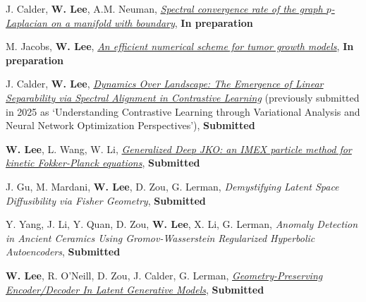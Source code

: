 

\begin{cvparagraph}

\vspace{0.5cm}
\begin{cvitems}
  \item J. Calder, \textbf{W. Lee}, A.M. Neuman, \href{}{\textit{Spectral convergence rate of the graph $p$-Laplacian on a manifold with boundary}}, \textbf{In preparation}
    \medskip
  \item M. Jacobs, \textbf{W. Lee}, \href{}{\textit{An efficient numerical scheme for tumor growth models}}, \textbf{In preparation}
    \medskip
  \item J. Calder, \textbf{W. Lee}, \href{https://arxiv.org/pdf/2503.10812}{\textit{Dynamics Over Landscape: The Emergence of Linear Separability via Spectral Alignment in Contrastive Learning}} (previously submitted in 2025 as `Understanding Contrastive Learning through Variational Analysis and Neural Network Optimization Perspectives'), \textbf{Submitted}
    \medskip
  \item \textbf{W. Lee}, L. Wang, W. Li, \href{}{\textit{Generalized Deep JKO: an IMEX particle method for kinetic Fokker-Planck equations}}, \textbf{Submitted}
    \medskip
  \item J. Gu, M. Mardani, \textbf{W. Lee}, D. Zou, G. Lerman, \textit{Demystifying Latent Space Diffusibility via Fisher Geometry}, \textbf{Submitted}
    \medskip
  \item Y. Yang, J. Li, Y. Quan, D. Zou, \textbf{W. Lee}, X. Li, G. Lerman, {\textit{Anomaly Detection in Ancient Ceramics Using Gromov-Wasserstein Regularized Hyperbolic Autoencoders}}, \textbf{Submitted} %
    \medskip
  \item \textbf{W. Lee}, R. O'Neill, D. Zou, J. Calder, G. Lerman, \href{https://arxiv.org/abs/2501.09876}{\textit{Geometry-Preserving Encoder/Decoder In Latent Generative Models}}, \textbf{Submitted} %

\end{cvitems}
\end{cvparagraph}
